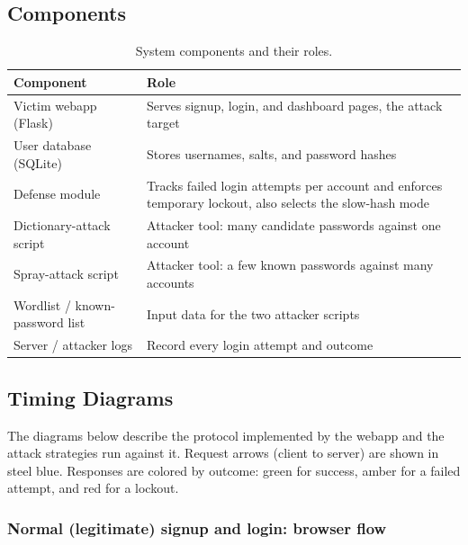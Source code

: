 \documentclass[11pt]{article}
\begin{document}
\subsection{Components}

\begin{table}[H]
\centering
\begin{tabularx}{\textwidth}{@{} l X @{}}
\toprule
\rowcolor{navy!12}
\textbf{Component} & \textbf{Role} \\
\midrule
Victim webapp (Flask) & Serves signup, login, and dashboard pages, the attack target \\
User database (SQLite) & Stores usernames, salts, and password hashes \\
Defense module & Tracks failed login attempts per account and enforces temporary lockout, also selects the slow-hash mode \\
Dictionary-attack script & Attacker tool: many candidate passwords against one account \\
Spray-attack script & Attacker tool: a few known passwords against many accounts \\
Wordlist / known-password list & Input data for the two attacker scripts \\
Server / attacker logs & Record every login attempt and outcome \\
\bottomrule
\end{tabularx}
\caption{System components and their roles.}
\end{table}

\newpage
\subsection{Timing Diagrams}

The diagrams below describe the protocol implemented by the webapp and the
attack strategies run against it. Request arrows (client to server) are
shown in \textcolor{steel}{steel blue}. Responses are colored by outcome:
\textcolor{oklive}{green for success}, \textcolor{warnamber!90!black}{amber
for a failed attempt}, and \textcolor{lockred}{red for a lockout}.

\subsubsection{Normal (legitimate) signup and login: browser flow}
\end{document}

